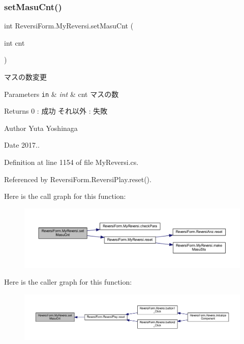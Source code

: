 \subsubsection{\texorpdfstring{set\+Masu\+Cnt()}{setMasuCnt()}}
{\footnotesize\ttfamily int Reversi\+Form.\+My\+Reversi.\+set\+Masu\+Cnt (\begin{DoxyParamCaption}\item[{int}]{cnt }\end{DoxyParamCaption})}



マスの数変更 


\begin{DoxyParams}[1]{Parameters}
\mbox{\tt in}  & {\em int} & cnt マスの数 \\
\hline
\end{DoxyParams}
\begin{DoxyReturn}{Returns}
0 \+: 成功 それ以外 \+: 失敗 
\end{DoxyReturn}
\begin{DoxyAuthor}{Author}
Yuta Yoshinaga 
\end{DoxyAuthor}
\begin{DoxyDate}{Date}
2017.. 
\end{DoxyDate}


Definition at line 1154 of file My\+Reversi.\+cs.



Referenced by Reversi\+Form.\+Reversi\+Play.\+reset().

Here is the call graph for this function\+:
\nopagebreak
\begin{figure}[H]
\begin{center}
\leavevmode
\includegraphics[width=350pt]{class_reversi_form_1_1_my_reversi_af9573f1da0d89180a4dbbd98d41a05fb_cgraph}
\end{center}
\end{figure}
Here is the caller graph for this function\+:
\nopagebreak
\begin{figure}[H]
\begin{center}
\leavevmode
\includegraphics[width=350pt]{class_reversi_form_1_1_my_reversi_af9573f1da0d89180a4dbbd98d41a05fb_icgraph}
\end{center}
\end{figure}
\mbox{\label{class_reversi_form_1_1_my_reversi_a1f7ba86f6e8d5dd2fa472a8994e4e3c5}} 
